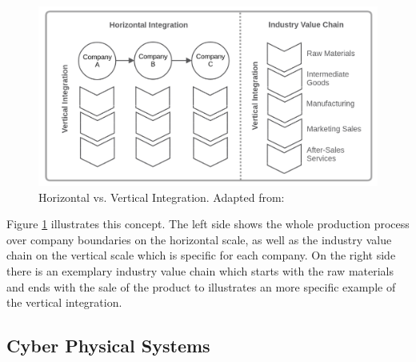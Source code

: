 \begin{figure}
    \centering
    \includegraphics[width=\textwidth]{resources/images/vertical_horizontal_integration.png}
    \caption[Horizontal vs. Vertical Integration]{Horizontal vs. Vertical Integration. Adapted from: \cite{Jur2013}}
    \label{fig:vertical_horizontal_integration}
\end{figure}

Figure \ref{fig:vertical_horizontal_integration} illustrates this concept.
The left side shows the whole production process over company boundaries on the horizontal scale, as well as the industry value chain on the vertical scale which is specific for each company.
On the right side there is an exemplary industry value chain which starts with the raw materials and ends with the sale of the product to illustrates an more specific example of the vertical integration.





\subsection{Cyber Physical Systems}

